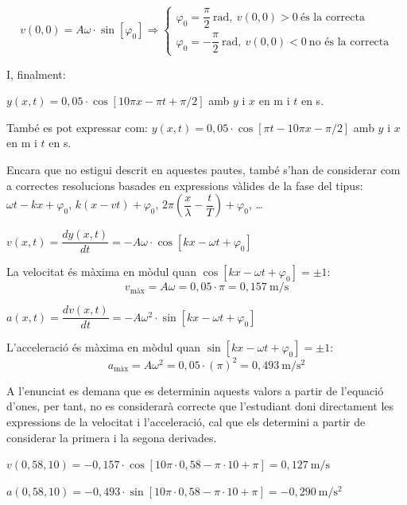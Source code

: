 \begin{solapartat}
\[ v(0,0) = A\omega\cdot\sin[\varphi_0] \Rightarrow \begin{cases}\varphi_0 = \dfrac{\pi}{2}\ \mathrm{rad},\ v(0,0) > 0\ \text{és la correcta}\\ \varphi_0 = -\dfrac{\pi}{2}\ \mathrm{rad},\ v(0,0) < 0\ \text{no és la correcta}\end{cases} \]

I, finalment:

$y(x,t) = 0,05\cdot\cos[10\pi x - \pi t + \pi/2]$ amb $y$ i $x$ en m i $t$ en s.

També es pot expressar com: $y(x,t) = 0,05\cdot\cos[\pi t - 10\pi x - \pi/2]$ amb $y$ i $x$ en m i $t$ en s.

Encara que no estigui descrit en aquestes pautes, també s'han de considerar com a correctes resolucions basades en expressions vàlides de la fase del tipus: $\omega t - kx + \varphi_0$, $k(x - vt) + \varphi_0$, $2\pi\left(\dfrac{x}{\lambda} - \dfrac{t}{T}\right) + \varphi_0$, \ldots
\end{solapartat}

\begin{solapartat}
 $v(x,t) = \dfrac{dy(x,t)}{dt} = -A\omega\cdot\cos[kx - \omega t + \varphi_0]$

La velocitat és màxima en mòdul quan $\cos[kx - \omega t + \varphi_0] = \pm 1$:
\[ v_{\text{màx}} = A\omega = 0,05\cdot\pi = 0,157\ \mathrm{m/s} \]

 $a(x,t) = \dfrac{dv(x,t)}{dt} = -A\omega^2\cdot\sin[kx - \omega t + \varphi_0]$

L'acceleració és màxima en mòdul quan $\sin[kx - \omega t + \varphi_0] = \pm 1$:
\[ a_{\text{màx}} = A\omega^2 = 0,05\cdot(\pi)^2 = 0,493\ \mathrm{m/s^2} \]

A l'enunciat es demana que es determinin aquests valors a partir de l'equació d'ones, per tant, no es considerarà correcte que l'estudiant doni directament les expressions de la velocitat i l'acceleració, cal que els determini a partir de considerar la primera i la segona derivades.

 $v(0,58,10) = -0,157\cdot\cos[10\pi\cdot 0,58 - \pi\cdot 10 + \pi] = 0,127\ \mathrm{m/s}$

 $a(0,58,10) = -0,493\cdot\sin[10\pi\cdot 0,58 - \pi\cdot 10 + \pi] = -0,290\ \mathrm{m/s^2}$
\end{solapartat}
